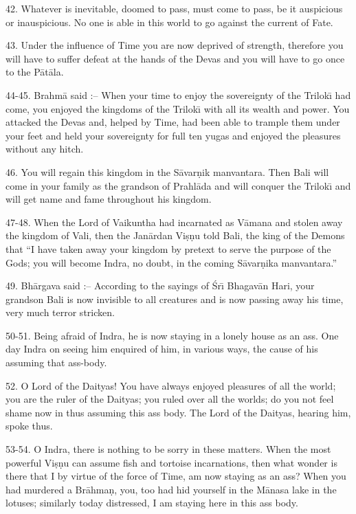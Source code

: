 42. Whatever is inevitable, doomed to pass, must come to pass, be it auspicious or inauspicious. No one is able in this world to go against the current of Fate.

43. Under the influence of Time you are now deprived of strength, therefore you will have to suffer defeat at the hands of the Devas and you will have to go once to the P\=at\=ala.

44-45. Brahm\=a said :-- When your time to enjoy the sovereignty of the Trilok\={\i} had come, you enjoyed the kingdoms of the Trilok\={\i} with all its wealth and power. You attacked the Devas and, helped by Time, had been able to trample them under your feet and held your sovereignty for full ten yugas and enjoyed the pleasures without any hitch.

46. You will regain this kingdom in the S\=avar\d{n}ik manvantara. Then Bali will come in your family as the grandson of Prahl\=ada and will conquer the Trilok\={\i} and will get name and fame throughout his kingdom.

47-48. When the Lord of Vaikuntha had incarnated as V\=amana and stolen away the kingdom of Vali, then the Jan\=ardan Vi\d{s}\d{n}u told Bali, the king of the Demons that ``I have taken away your kingdom by pretext to serve the purpose of the Gods; you will become Indra, no doubt, in the coming S\=avar\d{n}ika manvantara.''

49. Bh\=argava said :-- According to the sayings of \'Sr\={\i} Bhagav\=an Hari, your grandson Bali is now invisible to all creatures and is now passing away his time, very much terror stricken.

50-51. Being afraid of Indra, he is now staying in a lonely house as an ass. One day Indra on seeing him enquired of him, in various ways, the cause of his assuming that ass-body.

52. O Lord of the Daityas! You have always enjoyed pleasures of all the world; you are the ruler of the Daityas; you ruled over all the worlds; do you not feel shame now in thus assuming this ass body. The Lord of the Daityas, hearing him, spoke thus.

53-54. O Indra, there is nothing to be sorry in these matters. When the most powerful Vi\d{s}\d{n}u can assume fish and tortoise incarnations, then what wonder is there that I by virtue of the force of Time, am now staying as an ass? When you had murdered a Br\=ahma\d{n}, you, too had hid yourself in the M\=anasa lake in the lotuses; similarly today distressed, I am staying here in this ass body.

